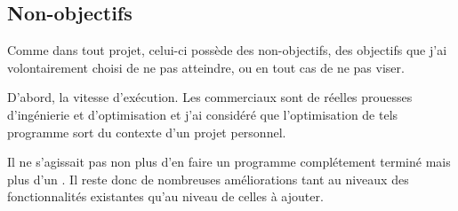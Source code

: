 \subsection{Non-objectifs}
Comme dans tout projet, celui-ci possède des non-objectifs, \ie des objectifs
que j'ai volontairement choisi de ne pas atteindre, ou en tout cas de ne pas
viser. 

\newpar D'abord, la vitesse d'exécution. Les  commerciaux sont
de réelles prouesses d'ingénierie et d'optimisation et j'ai considéré que
l'optimisation de tels programme sort du contexte d'un projet personnel. 

\newpar Il ne s'agissait pas non plus d'en faire un programme complétement
terminé mais plus d'un . Il reste donc de nombreuses
améliorations tant au niveaux des fonctionnalités existantes qu'au niveau de
celles à ajouter.
